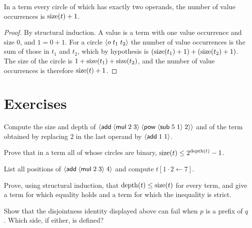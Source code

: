 \begin{proposition}\label{prop:leaves}
In a term every circle of which has exactly two operands, the number of value occurrences is $\operatorname{size}(t)+1$.
\end{proposition}
\begin{proof}
By structural induction. A value is a term with one value occurrence and size $0$, and $1 = 0+1$. For a circle $\langle o\; t_1\; t_2\rangle$ the number of value occurrences is the sum of those in $t_1$ and $t_2$, which by hypothesis is $(\operatorname{size}(t_1)+1)+(\operatorname{size}(t_2)+1)$. The size of the circle is $1+\operatorname{size}(t_1)+\operatorname{size}(t_2)$, and the number of value occurrences is therefore $\operatorname{size}(t)+1$.
\end{proof}

\section*{Exercises}

\begin{exercise}[\dag]\label{ex:ch2-size}
Compute the size and depth of $\langle \mathsf{add}\; \langle \mathsf{mul}\; 2\; 3\rangle\; \langle \mathsf{pow}\; \langle \mathsf{sub}\; 5\; 1\rangle\; 2\rangle\rangle$ and of the term obtained by replacing $2$ in the last operand by $\langle \mathsf{add}\; 1\; 1\rangle$.
\end{exercise}

\begin{exercise}[\dag]\label{ex:ch2-bound}
Prove that in a term all of whose circles are binary, $\operatorname{size}(t)\le 2^{\operatorname{depth}(t)}-1$.
\end{exercise}

\begin{exercise}[\dag]\label{ex:ch2-positions}
List all positions of $\langle \mathsf{add}\; \langle \mathsf{mul}\; 2\; 3\rangle\; 4\rangle$ and compute $t[1\cdot2\leftarrow 7]$.
\end{exercise}

\begin{exercise}
Prove, using structural induction, that $\operatorname{depth}(t)\le\operatorname{size}(t)$ for every term, and give a term for which equality holds and a term for which the inequality is strict.
\end{exercise}

\begin{exercise}
Show that the disjointness identity displayed above can fail when $p$ is a prefix of $q$. Which side, if either, is defined?
\end{exercise}
